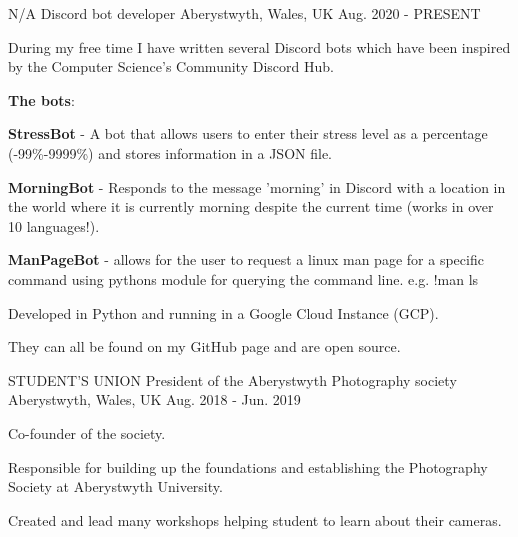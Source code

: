 

\begin{cventries}

  \cventry
    {N/A} %
    {Discord bot developer} %
    {Aberystwyth, Wales, UK} %
    {Aug. 2020 - PRESENT} %
    {
      \begin{cvitems} %
        \item {During my free time I have written several Discord bots which have been inspired by the Computer Science's Community Discord Hub.}
        \item {\textbf{The bots}:}\\
        \begin{cvitems}
          \item {\textbf{StressBot} - A bot that allows users to enter their stress level as a percentage (-99\%-9999\%) and stores information in a JSON file.}
          \item {\textbf{MorningBot} - Responds to the message 'morning' in Discord with a location in the world where it is currently morning despite the current time (works in over 10 languages!).}
          \item {\textbf{ManPageBot} - allows for the user to request a linux man page for a specific command using pythons module for querying the command line. e.g. !man ls}\\
        \end{cvitems}
        \item {Developed in Python and running in a Google Cloud Instance (GCP).}
        \item {They can all be found on my GitHub page and are open source.}
      \end{cvitems}
    }
    
  \cventry
    {STUDENT'S UNION} %
    {President of the Aberystwyth Photography society} %
    {Aberystwyth, Wales, UK} %
    {Aug. 2018 - Jun. 2019} %
    {
      \begin{cvitems} %
        \item {Co-founder of the society.}
        \item {Responsible for building up the foundations and establishing the Photography Society at Aberystwyth University.}
        \item {Created and lead many workshops helping student to learn about their cameras.}
      \end{cvitems}
    }


\end{cventries}
